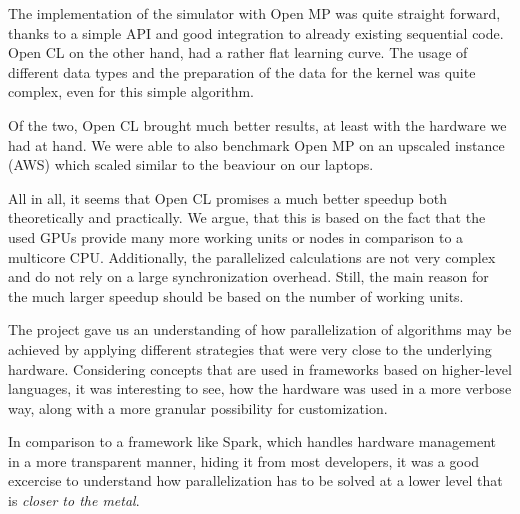\documentclass[a4paper,11pt]{scrartcl} %
\begin{document}
The implementation of the simulator with Open MP was quite straight forward, thanks to a simple API and good integration to already existing sequential code.
Open CL on the other hand, had a rather flat learning curve. The usage of different data types and the preparation of the data for the kernel was quite complex, even for this simple algorithm.

Of the two, Open CL brought much better results, at least with the hardware we had at hand. We were able to also benchmark Open MP on an upscaled instance (AWS) which scaled similar to the beaviour on our laptops.

All in all, it seems that Open CL promises a much better speedup both theoretically and practically. We argue, that this is based on the fact that the used GPUs provide many more working units or nodes in comparison to a multicore CPU. Additionally, the parallelized calculations are not very complex and do not rely on a large synchronization overhead. Still, the main reason for the much larger speedup should be based on the number of working units.

The project gave us an understanding of how parallelization of algorithms may be achieved by applying different strategies that were very close to the underlying hardware. Considering concepts that are used in frameworks based on higher-level languages, it was interesting to see, how the hardware was used in a more verbose way, along with a more granular possibility for customization.

In comparison to a framework like Spark, which handles hardware management in a more transparent manner, hiding it from most developers, it was a good excercise to understand how parallelization has to be solved at a lower level that is \emph{closer to the metal}.

\newpage
{}

\end{document}
